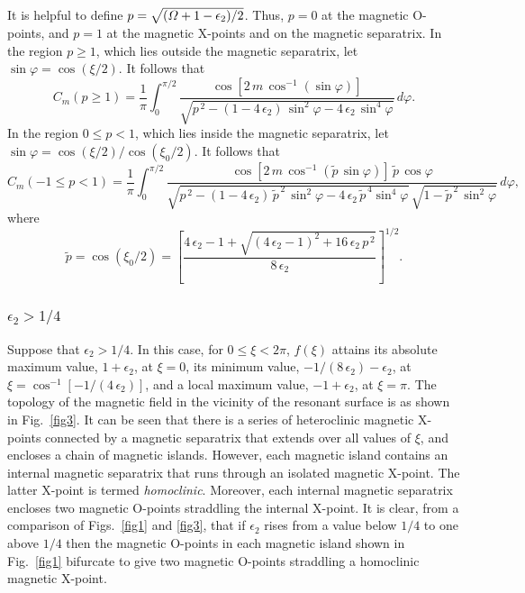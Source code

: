 \documentclass[12pt,prb,aps]{revtex4-1}
\begin{document}
It is helpful to define $p=\sqrt{({\mit\Omega}+1-\epsilon_2)/2}$.  Thus, $p=0$ at the magnetic O-points, and $p=1$ at the
magnetic X-points and on the magnetic separatrix. In the region $p\geq1$, which lies outside the magnetic separatrix, let $\sin\varphi = \cos(\xi/2)$. 
It follows that 
\begin{equation}
 C_m(p\geq 1)=\frac{1}{\pi} \int_{0}^{\pi/2}\frac{\cos[2\,m\,\cos^{-1}(\sin\varphi)]}
 {\sqrt{p^{\,2}-(1-4\,\epsilon_2)\,\sin^2\varphi-4\,\epsilon_2\,\sin^4\varphi}}\,d\varphi.
\end{equation}
In the region $0\leq p< 1$, which lies inside the magnetic separatrix, let 
$\sin\varphi = \cos(\xi/2)/\cos(\xi_0/2)$.
 It follows that 
\begin{equation}
 C_m(-1\leq p< 1)=\frac{1}{\pi} \int_{0}^{\pi/2}\frac{\cos[2\,m\,\cos^{-1}(\tilde{p}\,\sin\varphi)]\,\tilde{p}\,\cos\varphi}
 {\sqrt{p^{\,2}-(1-4\,\epsilon_2)\,\tilde{p}^{\,2}\,\sin^2\varphi-4\,\epsilon_2\,\tilde{p}^{\,4}\sin^4\varphi}\,\sqrt{1-\tilde{p}^{\,2}\,\sin^2\varphi}}\,d\varphi,
\end{equation}
where
\begin{equation}\label{tildep}
\tilde{p}= \cos(\xi_0/2) = \left[\frac{4\,\epsilon_2-1+\sqrt{(4\,\epsilon_2-1)^2+16\,\epsilon_2\,p^{\,2}}}{8\,\epsilon_2}\right]^{1/2}.
\end{equation}


\subsubsection{$\epsilon_2 > 1/4$}
Suppose that $\epsilon_2> 1/4$. In this case, for $0\leq \xi< 2\pi$, $f(\xi)$ attains its absolute maximum value, $1+\epsilon_2$, at $\xi=0$, its minimum value, $-1/(8\,\epsilon_2)-\epsilon_2$, at $\xi=\cos^{-1}[-1/(4\,\epsilon_2)]$,
and a local maximum value, $-1+\epsilon_2$, at $\xi=\pi$.    The topology of the magnetic field 
in the vicinity of the resonant surface is as shown in Fig.~\ref{fig3}. It can be seen that there is  a series of heteroclinic magnetic X-points connected by a
magnetic separatrix that extends over all values of $\xi$, and encloses a chain of magnetic islands. However,
each magnetic island contains an internal magnetic separatrix that runs through an isolated magnetic
X-point. The latter X-point is termed {\em homoclinic}. Moreover, each internal magnetic separatrix encloses two magnetic O-points straddling the
internal X-point. It is clear, from a comparison of Figs.~\ref{fig1} and \ref{fig3}, that if $\epsilon_2$ rises from a value below $1/4$ to one above $1/4$ then the magnetic O-points
in each magnetic island shown in Fig.~\ref{fig1} bifurcate to give two magnetic O-points straddling  a homoclinic magnetic X-point.
\end{document}
